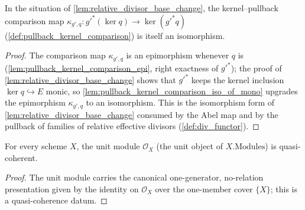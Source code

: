 \begin{lemma}
  \label{lem:relative_divisor_base_change_comparison_iso}
  In the situation of \cref{lem:relative_divisor_base_change}, the
  kernel--pullback comparison map
  \(\kappa_{g',q} : g'^{*}(\ker q) \to \ker(g'^{*} q)\)
  (\cref{def:pullback_kernel_comparison}) is itself an isomorphism.
\end{lemma}
\begin{proof}\leanok
  The comparison map \(\kappa_{g',q}\) is an epimorphism whenever \(q\)
  is (\cref{lem:pullback_kernel_comparison_epi}, right exactness of
  \(g'^{*}\)); the proof of \cref{lem:relative_divisor_base_change} shows
  that \(g'^{*}\) keeps the kernel inclusion \(\ker q \hookrightarrow E\)
  monic, so \cref{lem:pullback_kernel_comparison_iso_of_mono} upgrades
  the epimorphism \(\kappa_{g',q}\) to an isomorphism. This is the
  isomorphism form of \cref{lem:relative_divisor_base_change} consumed by
  the Abel map and by the pullback of families of relative effective
  divisors (\cref{def:div_functor}).
\end{proof}

\begin{lemma}
  \label{lem:unit_isQuasicoherent}
  For every scheme \(X\), the unit module \(\mathcal O_X\) (the unit object
  of \(X.\mathrm{Modules}\)) is quasi-coherent.
\end{lemma}
\begin{proof}\leanok
  The unit module carries the canonical one-generator, no-relation
  presentation given by the identity on \(\mathcal O_X\) over the
  one-member cover \(\{X\}\); this is a quasi-coherence datum.
\end{proof}

